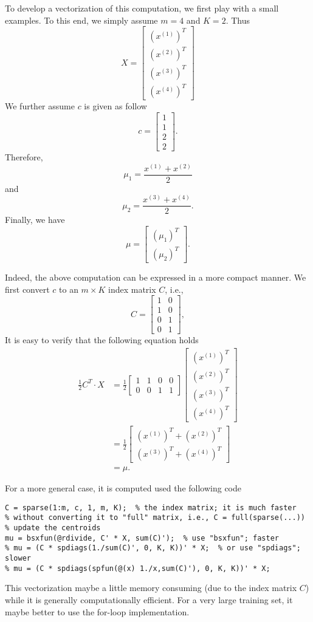 \documentclass{article}
\begin{document}
To develop a vectorization of this computation, we first play with a small examples. To this end, we simply assume $m=4$ and $K=2$. Thus
\[
X=
\left[\begin{array}{c}
(x^{(1)})^T\\
(x^{(2)})^T\\
(x^{(3)})^T\\
(x^{(4)})^T
\end{array}\right]
\]
We further assume $c$ is given as follow
\[
c=
\left[\begin{array}{c}
1\\
1\\
2\\
2
\end{array}\right].
\]
Therefore,
\[
\mu_1=\frac{x^{(1)}+x^{(2)}}{2}
\]
and
\[
\mu_2=\frac{x^{(3)}+x^{(4)}}{2}.
\]
Finally, we have
\[
\mu=
\left[\begin{array}{c}
(\mu_1)^T\\
(\mu_2)^T
\end{array}\right].
\]

Indeed, the above computation can be expressed in a more compact manner. We first convert $c$ to an $m\times K$ index matrix $C$, i.e.,
\[
C=
\left[\begin{array}{cc}
1 & 0 \\
1 & 0\\
0 & 1\\
0 & 1
\end{array}\right],
\]
It is easy to verify that the following equation holds
\[
\begin{split}
\frac{1}{2}C^T\cdot X
&=\frac{1}{2}
\left[\begin{array}{cccc}
1 & 1 & 0 & 0 \\
0 & 0 & 1 & 1
\end{array}\right]
\left[\begin{array}{c}
(x^{(1)})^T\\
(x^{(2)})^T\\
(x^{(3)})^T\\
(x^{(4)})^T
\end{array}\right]\\
&=\frac{1}{2}
\left[\begin{array}{c}
(x^{(1)})^T+(x^{(2)})^T\\
(x^{(3)})^T+(x^{(4)})^T
\end{array}\right]\\
&=\mu.
\end{split}
\]

For a more general case, it is computed used the following code
\begin{verbatim}
C = sparse(1:m, c, 1, m, K);  % the index matrix; it is much faster
% without converting it to "full" matrix, i.e., C = full(sparse(...))
% update the centroids
mu = bsxfun(@rdivide, C' * X, sum(C)');  % use "bsxfun"; faster
% mu = (C * spdiags(1./sum(C)', 0, K, K))' * X;  % or use "spdiags"; slower
% mu = (C * spdiags(spfun(@(x) 1./x,sum(C)'), 0, K, K))' * X;
\end{verbatim}
This vectorization maybe a little memory consuming (due to the index matrix $C$) while it is generally computationally efficient. For a very large training set, it maybe better to use the for-loop implementation.
\end{document}
